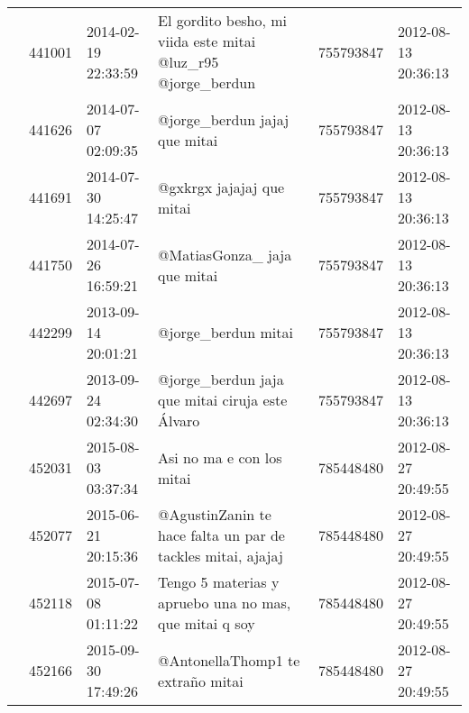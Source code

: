 \begin{tabular}{llllrl}
           & 441001  & 2014-02-19 22:33:59 &                                                                                 El gordito besho, mi viida este mitai @luz\_r95 @jorge\_berdun &   755793847 & 2012-08-13 20:36:13 \\
           & 441626  & 2014-07-07 02:09:35 &                                                                                                                @jorge\_berdun jajaj que mitai &   755793847 & 2012-08-13 20:36:13 \\
           & 441691  & 2014-07-30 14:25:47 &                                                                                                                    @gxkrgx jajajaj que mitai &   755793847 & 2012-08-13 20:36:13 \\
           & 441750  & 2014-07-26 16:59:21 &                                                                                                                 @MatiasGonza\_ jaja que mitai &   755793847 & 2012-08-13 20:36:13 \\
           & 442299  & 2013-09-14 20:01:21 &                                                                                                                          @jorge\_berdun mitai &   755793847 & 2012-08-13 20:36:13 \\
           & 442697  & 2013-09-24 02:34:30 &                                                                                              @jorge\_berdun jaja que mitai ciruja este Álvaro &   755793847 & 2012-08-13 20:36:13 \\
           & 452031  & 2015-08-03 03:37:34 &                                                                                                                    Asi no ma e con los mitai &   785448480 & 2012-08-27 20:49:55 \\
           & 452077  & 2015-06-21 20:15:36 &                                                                                  @AgustinZanin te hace falta un par de tackles mitai, ajajaj &   785448480 & 2012-08-27 20:49:55 \\
           & 452118  & 2015-07-08 01:11:22 &                                                                                       Tengo 5 materias y apruebo una no mas, que mitai q soy &   785448480 & 2012-08-27 20:49:55 \\
           & 452166  & 2015-09-30 17:49:26 &                                                                                                            @AntonellaThomp1 te extraño mitai &   785448480 & 2012-08-27 20:49:55 \\

\end{tabular}

